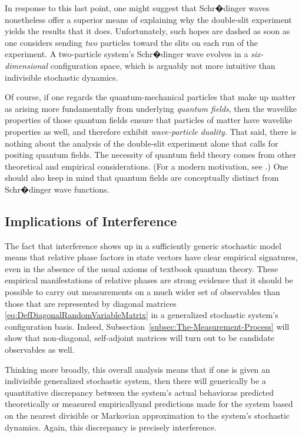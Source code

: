 \documentclass[12pt,english,prl,superscriptaddress,nobibnotes,nofootinbib]{revtex4-2}
\begin{document}
In response to this last point, one might suggest that Schr�dinger
waves nonetheless offer a superior means of explaining why the double-slit
experiment yields the results that it does. Unfortunately, such hopes
are dashed as soon as one considers sending \emph{two} particles toward
the slits on each run of the experiment. A two-particle system's Schr�dinger
wave evolves in a \emph{six-dimensional} configuration space, which
is arguably not more intuitive than indivisible stochastic dynamics.

Of course, if one regards the quantum-mechanical particles that make
up matter as arising more fundamentally from underlying \emph{quantum fields},
then the wavelike properties of those quantum fields ensure that particles
of matter have wavelike properties as well, and therefore exhibit
\emph{wave-particle duality}. That said, there is nothing about the
analysis of the double-slit experiment alone that calls for positing
quantum fields. The necessity of quantum field theory comes from other
theoretical and empirical considerations. (For a modern motivation,
see \citep{Weinberg:1996tqtfi}.) One should also keep in mind that
quantum fields are conceptually distinct from Schr�dinger wave functions.

\subsection{Implications of Interference\label{subsec:Implications-of-Interference}}

The fact that interference shows up in a sufficiently generic stochastic
model means that relative phase factors in state vectors have clear
empirical signatures, even in the absence of the usual axioms of textbook
quantum theory. These empirical manifestations of relative phases
are strong evidence that it should be possible to carry out measurements
on a much wider set of observables than those that are represented
by diagonal matrices \eqref{eq:DefDiagonalRandomVariableMatrix} in
a generalized stochastic system's configuration basis. Indeed, Subsection~\ref{subsec:The-Measurement-Process}
will show that non-diagonal, self-adjoint matrices will turn out to
be candidate observables as well.

Thinking more broadly, this overall analysis means that if one is
given an indivisible generalized stochastic system, then there will
generically be a quantitative discrepancy between the system's actual
behavior\textemdash as predicted theoretically or measured empirically\textemdash and
predictions made for the system based on the nearest divisible or
Markovian approximation to the system's stochastic dynamics. Again,
this discrepancy is precisely interference.
\end{document}
